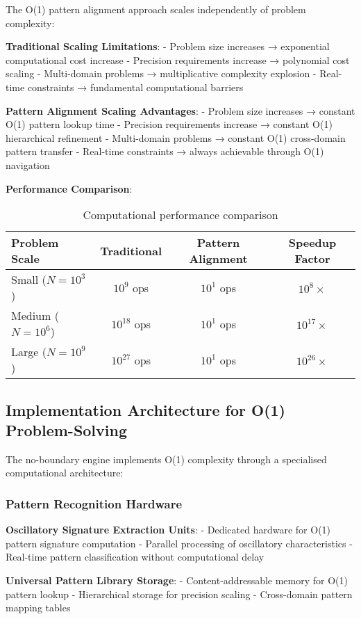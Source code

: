 \documentclass[11pt,a4paper]{article}
\theoremstyle{remark}
\begin{document}
The O(1) pattern alignment approach scales independently of problem complexity:

\textbf{Traditional Scaling Limitations}:
- Problem size increases → exponential computational cost increase
- Precision requirements increase → polynomial cost scaling
- Multi-domain problems → multiplicative complexity explosion
- Real-time constraints → fundamental computational barriers

\textbf{Pattern Alignment Scaling Advantages}:
- Problem size increases → constant O(1) pattern lookup time
- Precision requirements increase → constant O(1) hierarchical refinement
- Multi-domain problems → constant O(1) cross-domain pattern transfer
- Real-time constraints → always achievable through O(1) navigation

\textbf{Performance Comparison}:
\begin{table}[H]
\centering
\begin{tabular}{lccc}
\toprule
Problem Scale & Traditional & Pattern Alignment & Speedup Factor \\
\midrule
Small ($N = 10^3$) & $10^9$ ops & $10^1$ ops & $10^8\times$ \\
Medium ($N = 10^6$) & $10^{18}$ ops & $10^1$ ops & $10^{17}\times$ \\
Large ($N = 10^9$) & $10^{27}$ ops & $10^1$ ops & $10^{26}\times$ \\
\bottomrule
\end{tabular}
\caption{Computational performance comparison}
\end{table}

\subsection{Implementation Architecture for O(1) Problem-Solving}

The no-boundary engine implements O(1) complexity through a specialised computational architecture:

\subsubsection{Pattern Recognition Hardware}

\textbf{Oscillatory Signature Extraction Units}:
- Dedicated hardware for O(1) pattern signature computation
- Parallel processing of oscillatory characteristics
- Real-time pattern classification without computational delay

\textbf{Universal Pattern Library Storage}:
- Content-addressable memory for O(1) pattern lookup
- Hierarchical storage for precision scaling
- Cross-domain pattern mapping tables
\end{document}
